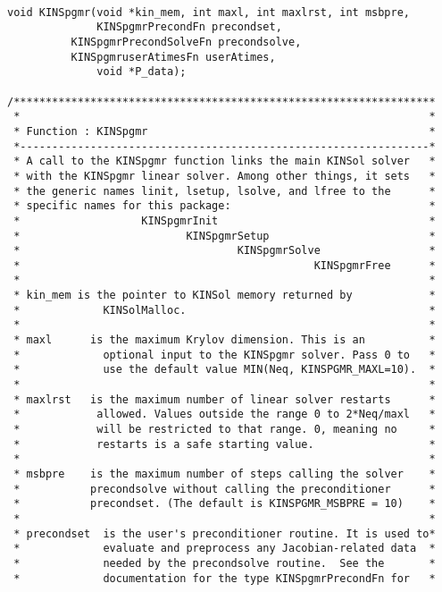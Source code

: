 \small
\begin{verbatim}

void KINSpgmr(void *kin_mem, int maxl, int maxlrst, int msbpre,
              KINSpgmrPrecondFn precondset, 
	      KINSpgmrPrecondSolveFn precondsolve,
	      KINSpgmruserAtimesFn userAtimes,
              void *P_data);
	 
/******************************************************************
 *                                                                *
 * Function : KINSpgmr                                            *
 *----------------------------------------------------------------*
 * A call to the KINSpgmr function links the main KINSol solver   *
 * with the KINSpgmr linear solver. Among other things, it sets   *
 * the generic names linit, lsetup, lsolve, and lfree to the      *
 * specific names for this package:                               *
 *                   KINSpgmrInit                                 *
 *                          KINSpgmrSetup                         *
 *                                  KINSpgmrSolve                 *
 *                                              KINSpgmrFree      *
 *                                                                *
 * kin_mem is the pointer to KINSol memory returned by            *
 *             KINSolMalloc.                                      *
 *                                                                *
 * maxl      is the maximum Krylov dimension. This is an          *
 *             optional input to the KINSpgmr solver. Pass 0 to   *
 *             use the default value MIN(Neq, KINSPGMR_MAXL=10).  *
 *                                                                *
 * maxlrst   is the maximum number of linear solver restarts      *
 *            allowed. Values outside the range 0 to 2*Neq/maxl   *
 *            will be restricted to that range. 0, meaning no     *
 *            restarts is a safe starting value.                  *
 *                                                                *
 * msbpre    is the maximum number of steps calling the solver    *
 *           precondsolve without calling the preconditioner      *
 *           precondset. (The default is KINSPGMR_MSBPRE = 10)    *
 *                                                                *
 * precondset  is the user's preconditioner routine. It is used to*
 *             evaluate and preprocess any Jacobian-related data  *
 *             needed by the precondsolve routine.  See the       *
 *             documentation for the type KINSpgmrPrecondFn for   *

\end{verbatim}
